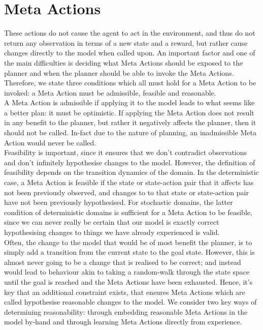 \section{Meta Actions}
These actions do not cause the agent to act in the environment, and thus do not return any observation in terms of a new state and a reward, but rather cause changes directly to the model when called upon. An important factor and one of the main difficulties is deciding what Meta Actions should be exposed to the planner and when the planner should be able to invoke the Meta Actions. Therefore, we state three conditions which all must hold for a Meta Action to be invoked: a Meta Action must be admissible, feasible and reasonable.
\\A Meta Action is admissible if applying it to the model leads to what seems like a better plan: it must be optimistic. If applying the Meta Action does not result in any benefit to the planner, but rather it negatively affects the planner, then it should not be called. In-fact due to the nature of planning, an inadmissible Meta Action would never be called.\\Feasibility is important, since it ensures that we don't contradict observations and don't infinitely hypothesise changes to the model. However, the definition of feasibility depends on the transition dynamics of the domain. In the deterministic case, a Meta Action is feasible if the state or state-action pair that it affects has not been previously observed, and changes to to that state or state-action pair have not been previously hypothesised.
For stochastic domains, the latter condition of deterministic domains is sufficient for a Meta Action to be feasible, since we can never really be certain that our model is exactly correct hypothesising changes to things we have already experienced is valid.
\\Often, the change to the model that would be of most benefit the planner, is to simply add a transition from the current state to the goal state. However, this is almost never going to be a change that is realised to be correct; and instead would lead to behaviour akin to taking a random-walk through the state space until the goal is reached and the Meta Actions have been exhausted. Hence, it's key that an additional constraint exists, that ensures Meta Actions which are called hypothesise reasonable changes to the model. We consider two key ways of determining reasonability: through embedding reasonable Meta Actions in the model by-hand and through learning Meta Actions directly from experience.

